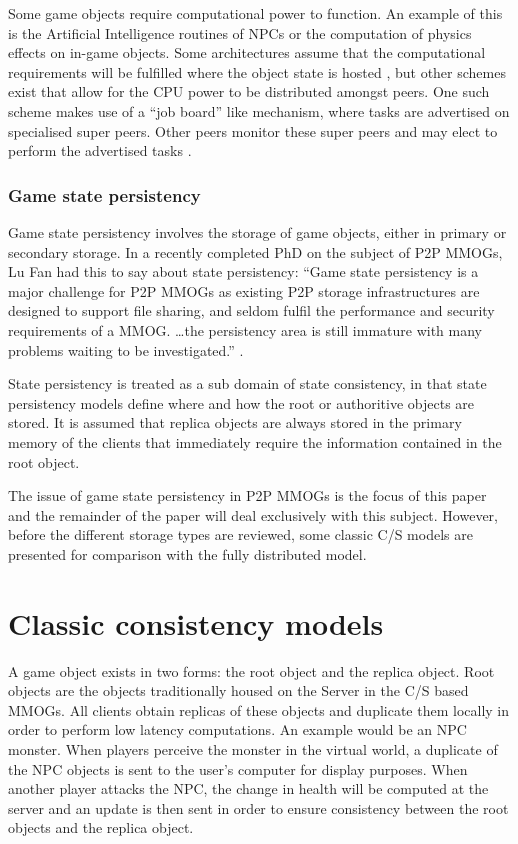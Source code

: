 \documentclass[10pt,a4paper,journal,cspaper,compsoc]{IEEEtran}
\begin{document}
Some game objects require computational power to function. An example of this is the Artificial Intelligence routines of NPCs or the computation of
physics effects on in-game objects. Some architectures assume that the computational requirements will be fulfilled where the object state is hosted
\cite{solipsis}, but other schemes exist that allow for the CPU power to be distributed amongst peers. One such scheme makes use of a ``job board''
like mechanism, where tasks are advertised on specialised super peers. Other peers monitor these super peers and may elect to perform the advertised
tasks \cite{fan_mediator_paper}.

\subsubsection{Game state persistency}

Game state persistency involves the storage of game objects, either in primary or secondary storage. In a recently completed PhD on the subject of
P2P MMOGs, Lu Fan had this to say about state persistency: ``Game state persistency is a major challenge for P2P MMOGs as existing P2P storage
infrastructures are designed to support file sharing, and seldom fulfil the performance and security requirements of a MMOG. \ldots the persistency
area is still immature with many problems waiting to be investigated.'' \cite{Fan_phd}.

State persistency is treated as a sub domain of state consistency, in that state persistency models define where and how the root or authoritive
objects are stored. It is assumed that replica objects are always stored in the primary memory of the clients that immediately require the
information contained in the root object.

The issue of game state persistency in P2P MMOGs is the focus of this paper and the remainder of the paper will deal exclusively with this subject.
However, before the different storage types are reviewed, some classic C/S models are presented for comparison with the fully distributed model.

\section{Classic consistency models}
\label{classic_models}

A game object exists in two forms: the root object and the replica object. Root objects are the objects traditionally housed on the Server in the C/S
based MMOGs. All clients obtain replicas of these objects and duplicate them locally in order to perform low latency computations. An example would
be an NPC monster. When players perceive the monster in the virtual world, a duplicate of the NPC objects is sent to the user's computer for display
purposes. When another player attacks the NPC, the change in health will be computed at the server and an update is then sent in order to ensure
consistency between the root objects and the replica object.
\end{document}
